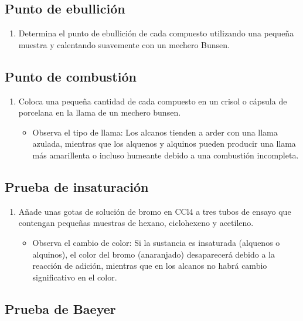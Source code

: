 \subsection{Punto de ebullición}

    \begin{enumerate}
        \item Determina el punto de ebullición de cada compuesto utilizando una pequeña muestra y calentando suavemente con un mechero Bunsen.
    \end{enumerate}
    
\subsection{Punto de combustión}

    \begin{enumerate}
        \item Coloca una pequeña cantidad de cada compuesto en un crisol o cápsula de porcelana en la llama de un mechero bunsen.
        \begin{itemize}
            \item Observa el tipo de llama: Los alcanos tienden a arder con una llama azulada, mientras que los alquenos y alquinos pueden producir una llama más amarillenta o incluso humeante debido a una combustión incompleta.
        \end{itemize}
    \end{enumerate}
    
\subsection{Prueba de insaturación}

    \begin{enumerate}
        \item Añade unas gotas de solución de bromo en CCl4 a tres tubos de ensayo que contengan pequeñas muestras de hexano, ciclohexeno y acetileno.
        \begin{itemize}
            \item Observa el cambio de color: Si la sustancia es insaturada (alquenos o alquinos), el color del bromo (anaranjado) desaparecerá debido a la reacción de adición, mientras que en los alcanos no habrá cambio significativo en el color.
        \end{itemize}
    \end{enumerate}
    
\subsection{Prueba de Baeyer}

